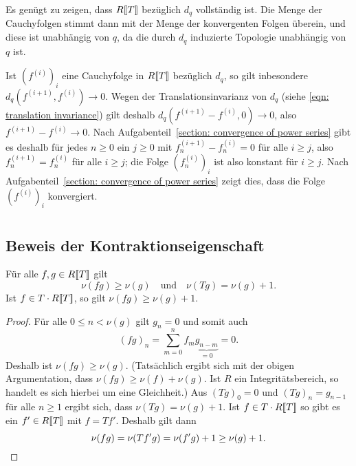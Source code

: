 \documentclass[a4paper, 10pt, numbers=noenddot]{scrartcl}
\begin{document}
Es genügt zu zeigen, dass $R[\![T]\!]$ bezüglich $d_q$ vollständig ist.
Die Menge der Cauchyfolgen stimmt dann mit der Menge der konvergenten Folgen überein, und diese ist unabhängig von $q$, da die durch $d_q$ induzierte Topologie unabhängig von $q$ ist.

Ist $(f^{(i)})_i$ eine Cauchyfolge in $R[\![T]\!]$ bezüglich $d_q$, so gilt inbesondere $d_q(f^{(i+1)}, f^{(i)}) \to 0$.
Wegen der Translationsinvarianz von $d_q$ (siehe \eqref{eqn: translation invariance}) gilt deshalb $d_q(f^{(i+1)} - f^{(i)}, 0) \to 0$, also $f^{(i+1)} - f^{(i)} \to 0$.
Nach Aufgabenteil~\ref{section: convergence of power series} gibt es deshalb für jedes $n \geq 0$ ein $j \geq 0$ mit $f^{(i+1)}_n - f^{(i)}_n = 0$ für alle $i \geq j$, also $f^{(i+1)}_n = f^{(i)}_n$ für alle $i \geq j$;
die Folge $(f^{(i)}_n)_i$ ist also konstant für $i \geq j$.
Nach Aufgabenteil~\ref{section: convergence of power series} zeigt dies, dass die Folge $(f^{(i)})_i$ konvergiert.





\section{}
\label{section: calculation of units}



\subsection*{Beweis der Kontraktionseigenschaft}

\begin{claim}
  \label{claim: rules for the degree}
  Für alle $f, g \in R[\![T]\!]$ gilt
  \[
    \nu(f g) \geq \nu(g)
    \quad\text{und}\quad
    \nu(T g) = \nu(g) + 1.
  \]
  Ist $f \in T \cdot R[\![T]\!]$, so gilt $\nu(f g) \geq \nu(g) + 1$.
\end{claim}
\begin{proof}
  Für alle $0 \leq n < \nu(g)$ gilt $g_n = 0$ und somit auch
  \[
      (f g)_n
    = \sum_{m=0}^n f_m \underbrace{g_{n-m}}_{=0}
    = 0.
  \]
  Deshalb ist $\nu(f g) \geq \nu(g)$.  
  (Tatsächlich ergibt sich mit der obigen Argumentation, dass $\nu(fg) \geq \nu(f) + \nu(g)$.
  Ist $R$ ein Integritätsbereich, so handelt es sich hierbei um eine Gleichheit.)
  Aus $(T g)_0 = 0$ und $(T g)_n = g_{n-1}$ für alle $n \geq 1$ ergibt sich, dass $\nu(T g) = \nu(g) + 1$.
  Ist $f \in T \cdot R[\![T]\!]$ so gibt es ein $f' \in R[\![T]\!]$ mit $f = T f'$.
  Deshalb gilt dann
  \[
          \nu(f g)
    =     \nu(T f' g)
    =     \nu(f' g) + 1
    \geq  \nu(g) + 1.
    \qedhere
  \]
\end{proof}
\end{document}
